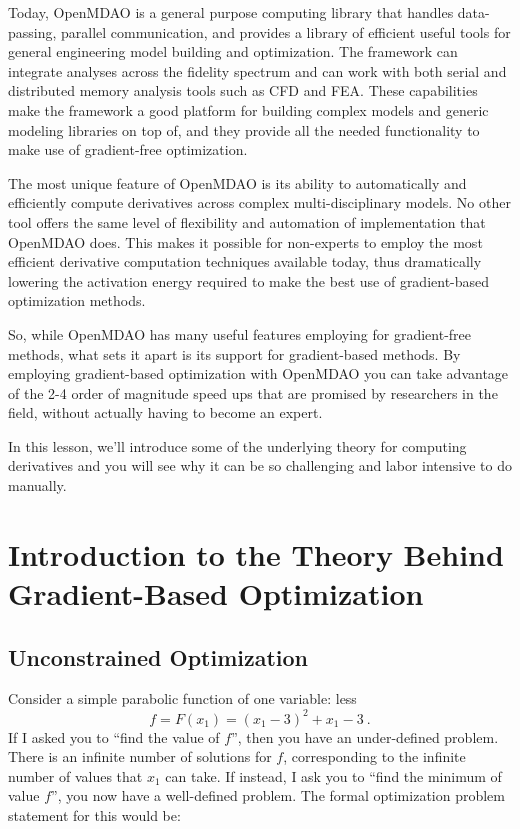 \documentclass[conf]{new-aiaa}
\begin{document}
    Today, OpenMDAO is a general purpose computing library that handles data-passing, parallel communication, and provides a library of efficient useful tools for general engineering model building and optimization. 
    The framework can integrate analyses across the fidelity spectrum and can work with both serial and distributed memory analysis tools such as CFD and FEA. 
    These capabilities make the framework a good platform for building complex models and generic modeling libraries on top of, and they provide all the needed functionality to make use of gradient-free optimization. 

    The most unique feature of OpenMDAO is its ability to automatically and efficiently compute derivatives across complex multi-disciplinary models. 
    No other tool offers the same level of flexibility and automation of implementation that OpenMDAO does. 
    This makes it possible for non-experts to employ the most efficient derivative computation techniques available today, thus dramatically lowering the activation energy required to make the best use of gradient-based optimization methods. 

    So, while OpenMDAO has many useful features employing for gradient-free methods, what sets it apart is its support for gradient-based methods. 
    By employing gradient-based optimization with OpenMDAO you can take advantage of the 2-4 order of magnitude speed ups that are promised by researchers in the field, without actually having to become an expert. 

    In this lesson, we'll introduce some of the underlying theory for computing derivatives and you will see why it can be so challenging and labor intensive to do manually. 


\section{Introduction to the Theory Behind Gradient-Based Optimization}

    \subsection{Unconstrained Optimization}
    Consider a simple parabolic function of one variable: less
    \begin{equation}
        f = F(x_1) = (x_1 - 3)^2 + x_1 - 3 \ . 
    \end{equation}
    If I asked you to ``find the value of $f$'', then you have an under-defined problem. 
    There is an infinite number of solutions for $f$, corresponding to the infinite number of values that $x_1$ can take. 
    If instead, I ask you to ``find the minimum of value $f$'', you now have a well-defined problem.    
    The formal optimization problem statement for this would be: 
\end{document}
